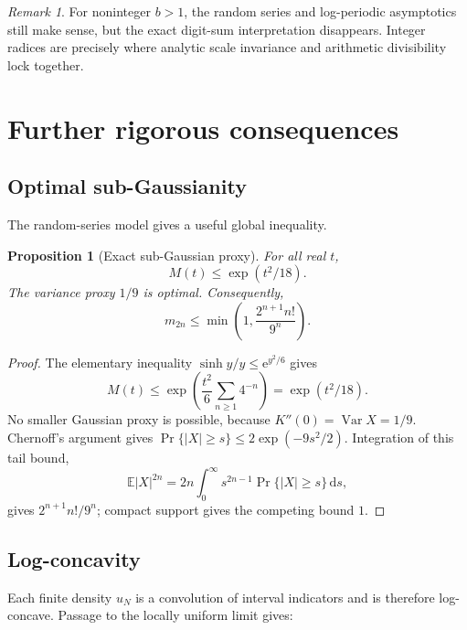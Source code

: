 \documentclass[11pt,oneside]{article}
\newtheorem{proposition}[theorem]{Proposition}
\theoremstyle{definition}
\theoremstyle{remark}
\newtheorem{remark}[theorem]{Remark}
\newcommand{\e}{\mathrm e}
\newcommand{\dd}{\,\mathrm d}
\newcommand{\Var}{\operatorname{Var}}
\newcommand{\E}{\mathbb E}
\begin{document}
\begin{remark}
For noninteger \(b>1\), the random series and log-periodic asymptotics still
make sense, but the exact digit-sum interpretation disappears.  Integer
radices are precisely where analytic scale invariance and arithmetic
divisibility lock together.
\end{remark}

\section{Further rigorous consequences}

\subsection{Optimal sub-Gaussianity}

The random-series model gives a useful global inequality.

\begin{proposition}[Exact sub-Gaussian proxy]
\label{prop:subgaussian}
For all real \(t\),
\begin{equation}
 M(t)\leq \exp(t^2/18).
 \label{eq:subgaussian}
\end{equation}
The variance proxy \(1/9\) is optimal.
Consequently,
\begin{equation}
 m_{2n}\leq
 \min\!\left(1,\frac{2^{n+1}n!}{9^n}\right).
 \label{eq:moment-bound}
\end{equation}
\end{proposition}

\begin{proof}
The elementary inequality
\(\sinh y/y\leq\e^{y^2/6}\) gives
\[
 M(t)
 \leq
 \exp\!\left(
  \frac{t^2}{6}\sum_{n\geq1}4^{-n}
 \right)
 =\exp(t^2/18).
\]
No smaller Gaussian proxy is possible, because
\(K''(0)=\Var X=1/9\).  Chernoff's argument gives
\(\Pr\{|X|\geq s\}\leq2\exp(-9s^2/2)\).  Integration of this tail bound,
\[
 \E|X|^{2n}
 =2n\int_0^\infty s^{2n-1}\Pr\{|X|\geq s\}\dd s,
\]
gives \(2^{n+1}n!/9^n\); compact support gives the competing bound \(1\).
\end{proof}

\subsection{Log-concavity}

Each finite density \(u_N\) is a convolution of interval indicators and is
therefore log-concave.  Passage to the locally uniform limit gives:
\end{document}
